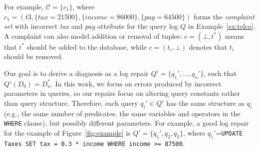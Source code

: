 For example,  $\mathcal{C} = \{c_1\}$, where 
$c_1 = (t3, \{tax = 21500\}, \{income = 86000\}, \{pay = 64500\})$ 
forms the \textit{complaint set} with incorrect \textit{tax} and \textit{pay} attribute 
for the query log $Q$ in Example~\ref{ex:telco}. A complaint 
can also model addition or removal of tuples: 
$c = (\bot, t^*)$ means that $t^*$ should be added to the database, 
while $c = (t_i, \bot)$ denotes that $t_i$ should be removed.

Our goal is to derive a diagnosis as a log repair
$Q'=\{q_1',\dots, q_n'\}$, such that
$Q'(D_0)=D_n^* $. In this work, we focus on errors produced
by incorrect parameters in queries, so our repairs focus on altering
query constants rather than query structure. Therefore, each query
$q_i'\in Q'$ has the same structure as $q_i$
(e.g., the same number of predicates, the same variables and operators 
in the \texttt{WHERE} clause), 
but possibly different parameters. 
For example, a good log repair for the
example of Figure~\ref{fig:example} is
$Q'=\{q_1',q_2,q_3\}$, where $q_1'$=\texttt{UPDATE Taxes
SET tax = 0.3 * income WHERE income >= 87500}.